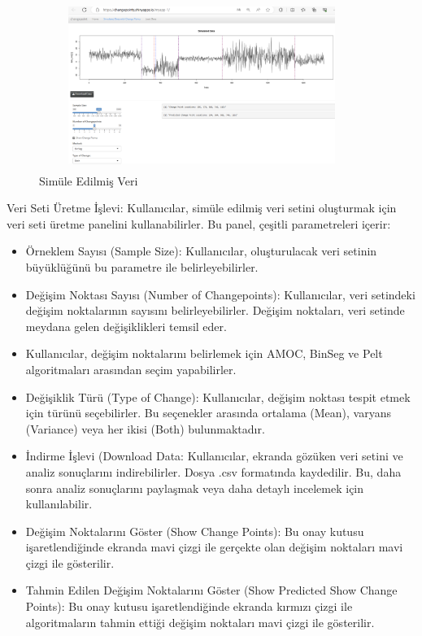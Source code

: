 \documentclass[12pt,twoside]{deuthesis}
\begin{document}
\begin{figure}
\includegraphics[width=400px,height=200px]{figure/sim} \caption{Simüle Edilmiş Veri}\label{fig:unnamed-chunk-13}
\end{figure}

Veri Seti Üretme İşlevi: Kullanıcılar, simüle edilmiş veri setini oluşturmak için veri seti üretme panelini kullanabilirler. Bu panel, çeşitli parametreleri içerir:

\begin{itemize}
\item
  Örneklem Sayısı (Sample Size): Kullanıcılar, oluşturulacak veri setinin büyüklüğünü bu parametre ile belirleyebilirler.
\item
  Değişim Noktası Sayısı (Number of Changepoints): Kullanıcılar, veri setindeki değişim noktalarının sayısını belirleyebilirler. Değişim noktaları, veri setinde meydana gelen değişiklikleri temsil eder.
\item
  Kullanıcılar, değişim noktalarını belirlemek için AMOC, BinSeg ve Pelt algoritmaları arasından seçim yapabilirler.
\item
  Değişiklik Türü (Type of Change): Kullanıcılar, değişim noktası tespit etmek için türünü seçebilirler. Bu seçenekler arasında ortalama (Mean), varyans (Variance) veya her ikisi (Both) bulunmaktadır.
\item
  İndirme İşlevi (Download Data: Kullanıcılar, ekranda gözüken veri setini ve analiz sonuçlarını indirebilirler. Dosya .csv formatında kaydedilir. Bu, daha sonra analiz sonuçlarını paylaşmak veya daha detaylı incelemek için kullanılabilir.
\item
  Değişim Noktalarını Göster (Show Change Points): Bu onay kutusu işaretlendiğinde ekranda mavi çizgi ile gerçekte olan değişim noktaları mavi çizgi ile gösterilir.
\item
  Tahmin Edilen Değişim Noktalarını Göster (Show Predicted Show Change Points): Bu onay kutusu işaretlendiğinde ekranda kırmızı çizgi ile algoritmaların tahmin ettiği değişim noktaları mavi çizgi ile gösterilir.
\end{itemize}
\end{document}
